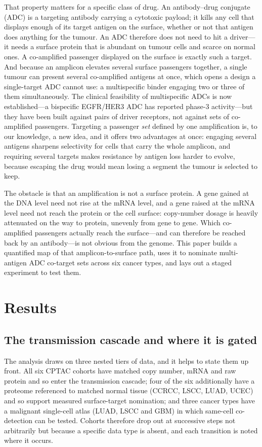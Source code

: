 \documentclass[times, twoside]{zHenriquesLab-StyleBioRxiv}
\begin{document}
That property matters for a specific class of drug. An antibody--drug conjugate (ADC) is a targeting antibody carrying a cytotoxic payload; it kills any cell that displays enough of its target antigen on the surface, whether or not that antigen does anything for the tumour\cite{ref1,ref2}. An ADC therefore does not need to hit a driver---it needs a surface protein that is abundant on tumour cells and scarce on normal ones. A co-amplified passenger displayed on the surface is exactly such a target. And because an amplicon elevates several surface passengers together, a single tumour can present several co-amplified antigens at once, which opens a design a single-target ADC cannot use: a multispecific binder engaging two or three of them simultaneously. The clinical feasibility of multispecific ADCs is now established---a bispecific EGFR/HER3 ADC has reported phase-3 activity\cite{ref3}---but they have been built against pairs of driver receptors, not against sets of co-amplified passengers. Targeting a passenger \emph{set} defined by one amplification is, to our knowledge, a new idea, and it offers two advantages at once: engaging several antigens sharpens selectivity for cells that carry the whole amplicon, and requiring several targets makes resistance by antigen loss harder to evolve, because escaping the drug would mean losing a segment the tumour is selected to keep.

The obstacle is that an amplification is not a surface protein. A gene gained at the DNA level need not rise at the mRNA level, and a gene raised at the mRNA level need not reach the protein or the cell surface: copy-number dosage is heavily attenuated on the way to protein, unevenly from gene to gene\cite{ref6,ref7,ref8,ref9,ref10}. Which co-amplified passengers actually reach the surface---and can therefore be reached back by an antibody---is not obvious from the genome. This paper builds a quantified map of that amplicon-to-surface path, uses it to nominate multi-antigen ADC co-target sets across six cancer types, and lays out a staged experiment to test them.

\section*{Results}

\subsection*{The transmission cascade and where it is gated}
The analysis draws on three nested tiers of data, and it helps to state them up front. All six CPTAC cohorts have matched copy number, mRNA and raw protein and so enter the transmission cascade; four of the six additionally have a proteome referenced to matched normal tissue (CCRCC, LSCC, LUAD, UCEC) and so support measured surface-target nomination; and three cancer types have a malignant single-cell atlas (LUAD, LSCC and GBM) in which same-cell co-detection can be tested. Cohorts therefore drop out at successive steps not arbitrarily but because a specific data type is absent, and each transition is noted where it occurs.
\end{document}
